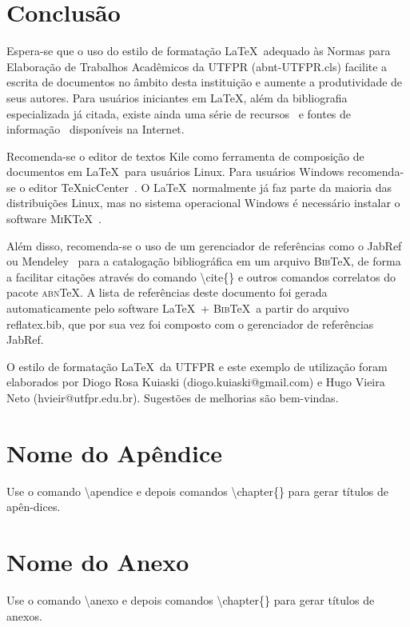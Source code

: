 \documentclass{abnt-UTFPR} %
\begin{document}
\chapter{Conclus\~ao}

Espera-se que o uso do estilo de formata\c{c}\~ao \LaTeX\ adequado \`as Normas para Elabora\c{c}\~ao de Trabalhos Acad\^emicos da UTFPR ({\ttfamily abnt-UTFPR.cls}) facilite a escrita de documentos no \^ambito desta institui\c{c}\~ao e aumente a produtividade de seus autores. Para usu\'arios iniciantes em \LaTeX, al\'em da bibliografia especializada j\'a citada, existe ainda uma s\'erie de recursos~\cite{CTAN2009} e fontes de informa\c{c}\~ao~\cite{TeX-Br2009,Wikibooks2009} dispon\'iveis na Internet.

Recomenda-se o editor de textos Kile como ferramenta de composi\c{c}\~ao de documentos em \LaTeX\ para usu\'arios Linux. Para usu\'arios Windows recomenda-se o editor \TeX nicCenter~\cite{TeXnicCenter2009}. O \LaTeX\ normalmente j\'a faz parte da maioria das distribui\c{c}\~oes Linux, mas no sistema operacional Windows \'e necess\'ario instalar o software \textsc{MiK}\TeX~\cite{MiKTeX2009}.

Al\'em disso, recomenda-se o uso de um gerenciador de refer\^encias como o JabRef~\cite{JabRef2009} ou Mendeley~\cite{Mendeley2009} para a cataloga\c{c}\~ao bibliogr\'afica em um arquivo \textsc{Bib}\TeX, de forma a facilitar cita\c{c}\~oes atrav\'es do comando {\ttfamily \textbackslash cite\{\}} e outros comandos correlatos do pacote \textsc{abn}\TeX. A lista de refer\^encias deste documento foi gerada automaticamente pelo software \LaTeX\ + \textsc{Bib}\TeX\ a partir do arquivo {\ttfamily reflatex.bib}, que por sua vez foi composto com o gerenciador de refer\^encias JabRef.

O estilo de formata\c{c}\~ao \LaTeX\ da UTFPR e este exemplo de utiliza\c{c}\~ao foram elaborados por Diogo Rosa Kuiaski (diogo.kuiaski@gmail.com) e Hugo Vieira Neto (hvieir@utfpr.edu.br). Sugest\~oes de melhorias s\~ao bem-vindas.




\apendice
\chapter{Nome do Ap\^endice}

Use o comando {\ttfamily \textbackslash apendice} e depois comandos {\ttfamily \textbackslash chapter\{\}}
para gerar t\'itulos de ap\^en-dices.


\anexo
\chapter{Nome do Anexo}

Use o comando {\ttfamily \textbackslash anexo} e depois comandos {\ttfamily \textbackslash chapter\{\}}
para gerar t\'itulos de anexos.
\end{document}
